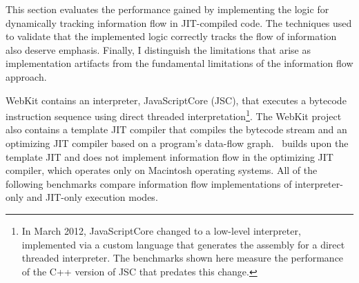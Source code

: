 This section evaluates the performance gained by implementing the logic for dynamically tracking information flow in JIT-compiled code.
The techniques used to validate that the implemented logic correctly tracks the flow of information also deserve emphasis.
Finally, I distinguish the limitations that arise as implementation artifacts from the fundamental limitations of the information flow approach.

WebKit contains an interpreter, JavaScriptCore (JSC), that executes a bytecode instruction sequence using direct threaded interpretation\footnote{
In March 2012, JavaScriptCore changed to a low-level interpreter, implemented via a custom language that generates the assembly for a direct threaded interpreter.
The benchmarks shown here measure the performance of the C++ version of JSC that predates this change.
}.
The WebKit project also contains a template JIT compiler that compiles the bytecode stream and an optimizing JIT compiler based on a program's data-flow graph.
\JitFlow\ builds upon the template JIT and does not implement information flow in the optimizing JIT compiler, which operates only on Macintosh operating systems.
All of the following benchmarks compare information flow implementations of interpreter-only and JIT-only execution modes.

